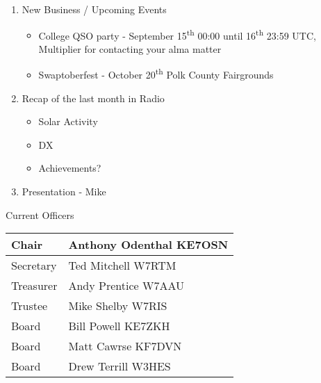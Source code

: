 \documentclass[letter,11pt]{extarticle}
\begin{document}
\begin{enumerate}
		\item  New Business / Upcoming Events
			\begin{itemize}
				\item College QSO party - September 15\textsuperscript{th} 00:00 until 16\textsuperscript{th} 23:59 UTC, Multiplier for contacting your alma matter
				\item Swaptoberfest - October 20\textsuperscript{th} Polk County Fairgrounds
			\end{itemize}
		\item Recap of the last month in Radio
			\begin{itemize}
				\item Solar Activity
				\item DX
				\item Achievements?
			\end{itemize}
		\item  Presentation - Mike
	\end{enumerate}


	Current Officers \\
	\begin{tabular}{|l|l|} \hline
		Chair & Anthony Odenthal KE7OSN \\ \hline
		Secretary & Ted Mitchell W7RTM \\ \hline
		Treasurer & Andy Prentice W7AAU \\ \hline
		Trustee & Mike Shelby W7RIS   \\ \hline
		Board & Bill Powell KE7ZKH \\ \hline
		Board & Matt Cawrse KF7DVN \\ \hline
		Board & Drew Terrill W3HES\\ \hline
	\end{tabular}
	
	\subsection*{}
	
\end{document}
